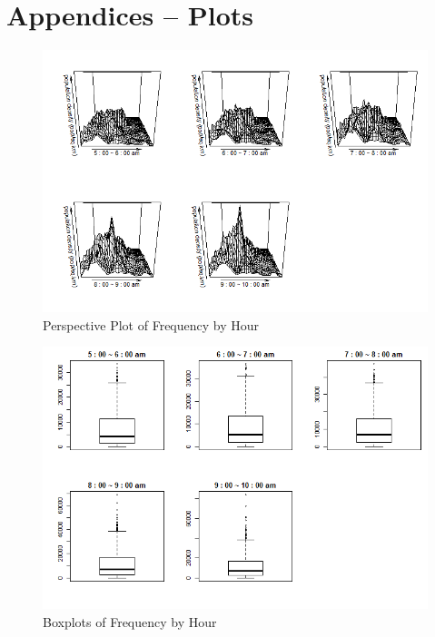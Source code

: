\documentclass[hidelinks,12pt]{article}
\begin{document}
	\section{Appendices -- Plots} \label{sec:appa}
	\begin{figure}[!ht]
		\includegraphics[width=\textwidth]{persp.png}
		\caption{Perspective Plot of Frequency by Hour \label{fig:perp}}
	\end{figure}
	\begin{figure}[!ht]
		\includegraphics[width=\textwidth]{box.png}
		\caption{Boxplots of Frequency by Hour \label{fig:boxplot}}
	\end{figure}
\end{document}
